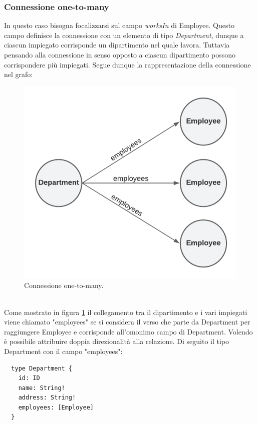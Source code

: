 \subsubsection*{Connessione one-to-many}
In questo caso bisogna focalizzarsi sul campo \textit{worksIn} di Employee. Questo campo definisce la connessione con un elemento di tipo \textit{Department}, dunque a ciascun impiegato corrisponde un dipartimento nel quale lavora. Tuttavia pensando alla connessione in senso opposto a ciascun dipartimento possono corrispondere più impiegati. Segue dunque la rappresentazione della connessione nel grafo:\\

\begin{figure}[!h]
\centering
\includegraphics[width=0.4\linewidth]{immagini/one_to_many.pdf}
\caption{Connessione one-to-many.}
\label{one-to-many}
\end{figure}
\mbox{}\\
Come mostrato in figura \ref{one-to-many} il collegamento tra il dipartimento e i vari impiegati viene chiamato "employees" se si considera il verso che parte da Department per raggiungere Employee e corrisponde all'omonimo campo di Department. Volendo è possibile attribuire doppia direzionalità alla relazione. Di seguito il tipo Department con il campo "employees":
\begin{verbatim}
  type Department {
    id: ID
    name: String!
    address: String!
    employees: [Employee]
  }
\end{verbatim}
